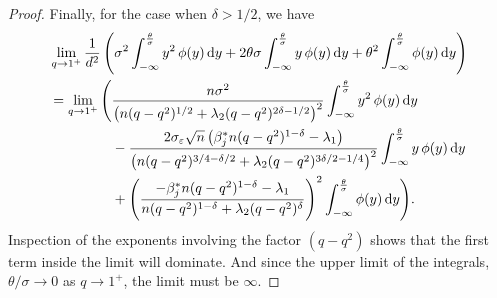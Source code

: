 \begin{proof}
  Finally, for the case when \(\delta > 1/2\), we have
  \begin{multline*}
    \lim_{q \rightarrow 1^+} \frac{1}{d^2} \left(\sigma^2 \int_{-\infty}^\frac{\theta}{\sigma} y^2 \operatorname{\phi}(y) \mathop{}\!\mathrm{d} y + 2 \theta \sigma \int_{-\infty}^\frac{\theta}{\sigma} y \operatorname{\phi}(y) \mathop{}\!\mathrm{d} y + \theta^2 \int_{-\infty}^\frac{\theta}{\sigma} \operatorname{\phi}(y) \mathop{}\!\mathrm{d} y\right) \\
    \begin{aligned}
      = \lim_{q \rightarrow 1^+} \Bigg( & \frac{n \sigma^2}{ \left(n (q-q^2)^{1/2} + \lambda_2(q-q^2)^{2\delta - 1/2}\right)^2} \int_{-\infty}^\frac{\theta}{\sigma} y^2 \operatorname{\phi}(y) \mathop{}\!\mathrm{d} y                                                                                          \\
                                        & - \frac{2\sigma_\varepsilon \sqrt{n}\left(\beta_j^* n (q- q^2)^{1 - \delta} - \lambda_1\right)}{\left(n(q-q^2)^{3/4 - \delta/2} + \lambda_2(q-q^2)^{3\delta / 2 - 1/4}\right)^2} \int_{-\infty}^\frac{\theta}{\sigma} y \operatorname{\phi}(y) \mathop{}\!\mathrm{d} y \\
                                        & + \left(\frac{-\beta_j^*n(q-q^2)^{1-\delta} - \lambda_1}{n(q-q^2)^{1-\delta} + \lambda_2(q-q^2)^\delta}\right)^2 \int_{-\infty}^\frac{\theta}{\sigma} \operatorname{\phi}(y) \mathop{}\!\mathrm{d} y\Bigg).
    \end{aligned}
  \end{multline*}
  Inspection of the exponents involving the factor \((q - q^2)\) shows that the first term inside the limit will dominate. And since the upper limit of the integrals, \(\theta/\sigma \rightarrow  0\)  as \(q \rightarrow 1^+\), the limit must be \(\infty\).










\end{proof}
